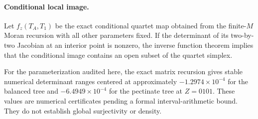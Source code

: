 \paragraph{Conditional local image.}
Let $f_z(T_A,T_1)$ be the exact conditional quartet map obtained from the
finite-$M$ Moran recursion with all other parameters fixed. If the determinant
of its two-by-two Jacobian at an interior point is nonzero, the inverse
function theorem implies that the conditional image contains an open subset of
the quartet simplex.

For the parameterization audited here, the exact matrix recursion gives stable
numerical determinant ranges centered at approximately
$-1.2974\times10^{-4}$ for the balanced tree and
$-6.4949\times10^{-4}$ for the pectinate tree at $Z=0101$.
These values are numerical certificates pending a formal interval-arithmetic
bound. They do not establish global surjectivity or density.
